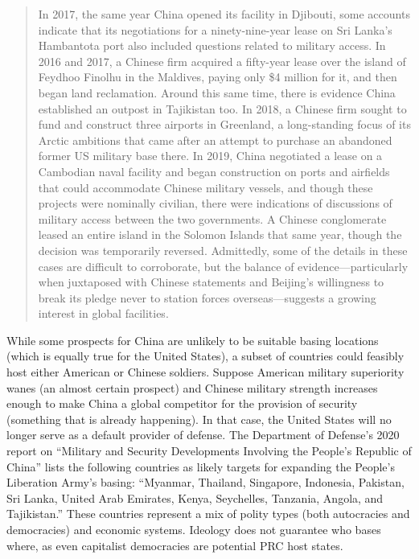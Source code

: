 \begin{quote}
	In 2017, the same year China opened its facility in Djibouti, some accounts indicate that its negotiations for a ninety-nine-year lease on Sri Lanka's Hambantota port also included questions related to military access. In 2016 and 2017, a Chinese firm acquired a fifty-year lease over the island of Feydhoo Finolhu in the Maldives, paying only \$4 million for it, and then began land reclamation. Around this same time, there is evidence China established an outpost in Tajikistan too. In 2018, a Chinese firm sought to fund and construct three airports in Greenland, a long-standing focus of its Arctic ambitions that came after an attempt to purchase an abandoned former US military base there. In 2019, China negotiated a lease on a Cambodian naval facility and began construction on ports and airfields that could accommodate Chinese military vessels, and though these projects were nominally civilian, there were indications of discussions of military access between the two governments. A Chinese conglomerate leased an entire island in the Solomon Islands that same year, though the decision was temporarily reversed. Admittedly, some of the details in these cases are difficult to corroborate, but the balance of evidence—particularly when juxtaposed with Chinese statements and Beijing's willingness to break its pledge never to station forces overseas—suggests a growing interest in global facilities.\autocite[p. 295]{Doshi2021}
\end{quote}


While some prospects for China are unlikely to be suitable basing locations (which is equally true for the United States), a subset of countries could feasibly host either American or Chinese soldiers. Suppose American military superiority wanes (an almost certain prospect) and Chinese military strength increases enough to make China a global competitor for the provision of security (something that is already happening). In that case, the United States will no longer serve as a default provider of defense. The Department of Defense's 2020 report on ``Military and Security Developments Involving the People's Republic of China'' lists the following countries as likely targets for expanding the People's Liberation Army's basing: ``Myanmar, Thailand, Singapore, Indonesia, Pakistan, Sri Lanka, United Arab Emirates, Kenya, Seychelles, Tanzania, Angola, and Tajikistan.''\autocite[p. x]{OSD2020} These countries represent a mix of polity types (both autocracies and democracies) and economic systems. Ideology does not guarantee who bases where, as even capitalist democracies are potential PRC host states.

